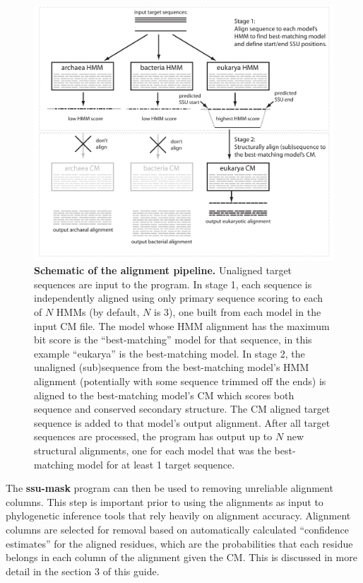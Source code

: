 \begin{figure}
  \begin{center}
\includegraphics[width=6.5in]{Figures/ssualign-schematic}
  \end{center}
\caption{\textbf{Schematic of the  alignment
    pipeline.} Unaligned target sequences are input to the
  program. In stage 1, each sequence is independently aligned
  using only primary sequence scoring to each of $N$ HMMs (by
  default, $N$ is 3), one built from each model in the input
  CM file. The model whose HMM alignment has the maximum bit
  score is the ``best-matching'' model for that sequence, in
  this example ``eukarya'' is the best-matching model. In
  stage 2, the unaligned (sub)sequence from the best-matching
  model's HMM alignment (potentially with some sequence
  trimmed off the ends) is aligned to the best-matching
  model's CM which scores both sequence and conserved
  secondary structure. The CM aligned target sequence is added
  to that model's output alignment. After all target sequences
  are processed, the program has output up to $N$ new
  structural alignments, one for each model that was the
  best-matching model for at least 1 target sequence.}
\label{fig:strategy}
\end{figure}

The \textbf{ssu-mask} program can then be used to removing unreliable
alignment columns. This step is important prior to using the
alignments as input to phylogenetic inference tools that rely heavily
on alignment accuracy.  Alignment columns are selected for removal
based on automatically calculated ``confidence estimates'' for the
aligned residues, which are the probabilities that each residue
belongs in each column of the alignment given the CM. This is
discussed in more detail in the section 3 of this guide.

